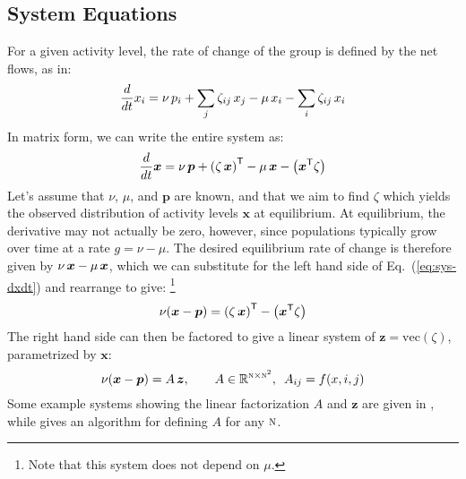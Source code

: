 \documentclass{article}
\newcommand{\N}{\textsc{n}}
\begin{document}
\subsection{System Equations}
For a given activity level, the rate of change of the group is defined by the net flows, as in:
\begin{equation}
  \frac{d}{dt}x_i
= \nu \thinspace p_i + \sum_{j}{\zeta_{ij} \thinspace x_j}
- \mu \thinspace x_i - \sum_{i}{\zeta_{ij} \thinspace x_i}
\end{equation}
In matrix form, we can write the entire system as:
\begin{equation}\label{eq:sys-dxdt}
  \frac{d}{dt}\bm{x}
= \nu \thinspace \bm{p} + {\left(\zeta \thinspace \bm{x}\right)}^{\mathsf{T}}
-  \mu \thinspace \bm{x} - \left(\bm{x}^{\mathsf{T}} \zeta\right)
\end{equation}
Let's assume that $\nu$, $\mu$, and $\bm{p}$ are known,
and that we aim to find $\zeta$ which yields
the observed distribution of activity levels $\bm{x}$ at equilibrium.
At equilibrium, the derivative may not actually be zero, however,
since populations typically grow over time at a rate $g = \nu - \mu$.
The desired equilibrium rate of change is therefore given by
$\nu\thinspace\bm{x} - \mu\thinspace\bm{x}$,
which we can substitute for the left hand side of Eq.~(\ref{eq:sys-dxdt})
and rearrange to give:%
\footnote{Note that this system does not depend on $\mu$.}
\begin{equation}
\nu (\bm{x} - \bm{p}) =
{\left(\zeta \thinspace \bm{x}\right)}^{\mathsf{T}} - \left(\bm{x}^{\mathsf{T}} \zeta\right)
\end{equation}
The right hand side can then be factored to give
a linear system of $\bm{z} = \mathrm{vec}(\zeta)$, parametrized by $\bm{x}$:
\begin{equation}\label{eq:y=Az}
\nu (\bm{x} - \bm{p}) =
A \thinspace \bm{z}, \qquad
A \in \mathbb{R}^{\N \times \N^2}, \enspace A_{ij} = f(x,i,j)
\end{equation}
Some example systems showing the linear factorization $A$ and $\bm{z}$
are given in ,
while  gives an algorithm for defining $A$ for any $\N$.
\end{document}
